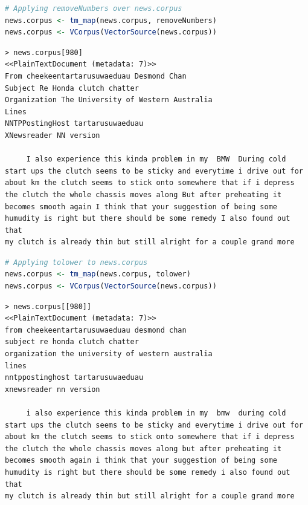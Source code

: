 \documentclass[a4paper,20pt]{article}
\begin{document}
\begin{lstlisting}[language = R]
# Applying removeNumbers over news.corpus
news.corpus <- tm_map(news.corpus, removeNumbers)
news.corpus <- VCorpus(VectorSource(news.corpus))
\end{lstlisting}
\begin{verbatim}
> news.corpus[980]
<<PlainTextDocument (metadata: 7)>>
From cheekeentartarusuwaeduau Desmond Chan
Subject Re Honda clutch chatter
Organization The University of Western Australia
Lines 
NNTPPostingHost tartarusuwaeduau
XNewsreader NN version  

     I also experience this kinda problem in my  BMW  During cold
start ups the clutch seems to be sticky and everytime i drive out for
about km the clutch seems to stick onto somewhere that if i depress
the clutch the whole chassis moves along But after preheating it
becomes smooth again I think that your suggestion of being some
humudity is right but there should be some remedy I also found out that
my clutch is already thin but still alright for a couple grand more
\end{verbatim}

\begin{lstlisting}[language = R]
# Applying tolower to news.corpus
news.corpus <- tm_map(news.corpus, tolower)
news.corpus <- VCorpus(VectorSource(news.corpus))
\end{lstlisting}
\begin{verbatim}
> news.corpus[[980]]
<<PlainTextDocument (metadata: 7)>>
from cheekeentartarusuwaeduau desmond chan
subject re honda clutch chatter
organization the university of western australia
lines 
nntppostinghost tartarusuwaeduau
xnewsreader nn version  

     i also experience this kinda problem in my  bmw  during cold
start ups the clutch seems to be sticky and everytime i drive out for
about km the clutch seems to stick onto somewhere that if i depress
the clutch the whole chassis moves along but after preheating it
becomes smooth again i think that your suggestion of being some
humudity is right but there should be some remedy i also found out that
my clutch is already thin but still alright for a couple grand more
\end{verbatim}
\end{document}
